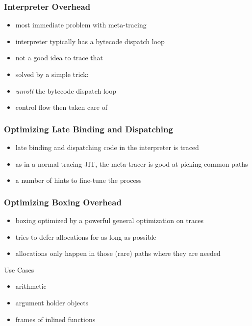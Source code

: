 \documentclass[utf8x]{beamer}
\begin{document}
\begin{frame}
  \frametitle{Interpreter Overhead}
  \begin{itemize}
      \item most immediate problem with meta-tracing
      \item interpreter typically has a bytecode dispatch loop
      \item not a good idea to trace that
      \pause
      \item solved by a simple trick:
      \item \emph{unroll} the bytecode dispatch loop
      \item control flow then taken care of
  \end{itemize}
\end{frame}

\begin{frame}
  \frametitle{Optimizing Late Binding and Dispatching}
  \begin{itemize}
      \item late binding and dispatching code in the interpreter is traced
      \item as in a normal tracing JIT, the meta-tracer is good at picking common paths
      \item a number of hints to fine-tune the process
  \end{itemize}
\end{frame}

\begin{frame}
  \frametitle{Optimizing Boxing Overhead}
  \begin{itemize}
      \item boxing optimized by a powerful general optimization on traces
      \item tries to defer allocations for as long as possible
      \item allocations only happen in those (rare) paths where they are needed
  \end{itemize}
  \pause
  \begin{block}{Use Cases}
      \begin{itemize}
          \item arithmetic
          \item argument holder objects
          \item frames of inlined functions
      \end{itemize}
  \end{block}
\end{frame}
\end{document}
